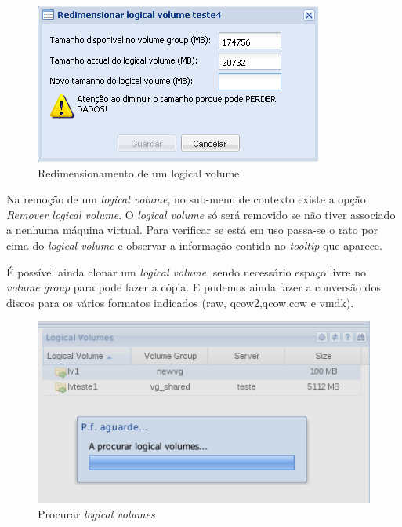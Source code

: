 \begin{figure}[H]
        \begin{center}
        \includegraphics[scale=0.5]{screenshots/storage_lv_resize.png}
        \caption{Redimensionamento de um logical volume}
        \label{fig:storage_lv_resize}
        \end{center}
\end{figure}

Na remoção de um \emph{logical volume}, no sub-menu de contexto existe a opção \emph{Remover logical volume}. O \emph{logical volume} só será removido se não tiver associado a nenhuma máquina virtual. Para verificar se está em uso passa-se o rato por cima do \emph{logical volume} e observar a informação contida no \emph{tooltip} que aparece.

É possível ainda clonar um \emph{logical volume}, sendo necessário espaço livre no \emph{volume group} para pode fazer a cópia.
E podemos ainda fazer a conversão dos discos para os vários formatos indicados (raw, qcow2,qcow,cow e vmdk).

\begin{figure}[H]
        \begin{center}
        \includegraphics[scale=0.45]{screenshots/node_storage_lv_search.png}
        \caption{Procurar \emph{logical volumes}}
        \label{fig:storage_lv_search}
        \end{center}
\end{figure}

